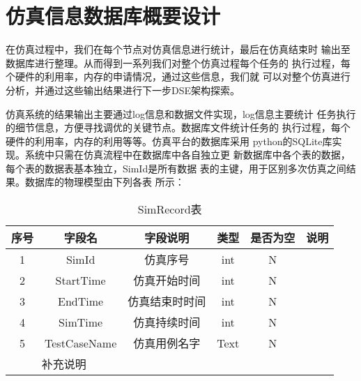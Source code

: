 \section{仿真信息数据库概要设计}
在仿真过程中，我们在每个节点对仿真信息进行统计，最后在仿真结束时
输出至数据库进行整理。从而得到一系列我们对整个仿真过程每个任务的
执行过程，每个硬件的利用率，内存的申请情况，通过这些信息，我们就
可以对整个仿真进行分析，并通过这些输出结果进行下一步DSE架构探索。

仿真系统的结果输出主要通过log信息和数据文件实现，log信息主要统计
任务执行的细节信息，方便寻找调优的关键节点。数据库文件统计任务的
执行过程，每个硬件的利用率，内存的利用等等。仿真平台的数据库采用
python的SQLite库实现。系统中只需在仿真流程中在数据库中各自独立更
新数据库中各个表的数据，每个表的数据表基本独立，SimId是所有数据
表的主键，用于区别多次仿真之间结果。数据库的物理模型由下列各表
所示：

\begin{table}[!h]
    \centering\normalsize
    \caption{SimRecord表}
    \begin{tabular}{|c|c|c|c|c|c|}
    \hline
    \textbf{序号} & \textbf{字段名} & \textbf{字段说明} & \textbf{类型} & \textbf{是否为空} & \textbf{说明} \\ \hline
    1           & SimId        & 仿真序号          & int         & N             &             \\ \hline
    2           & StartTime    & 仿真开始时间        & int         & N             &             \\ \hline
    3           & EndTime      & 仿真结束时时间       & int         & N             &             \\ \hline
    4           & SimTime      & 仿真持续时间        & int         & N             &             \\ \hline
    5           & TestCaseName & 仿真用例名字        & Text        & N             &             \\ \hline
    \multicolumn{2}{|c|}{补充说明} &               &             &               &             \\ \hline
    \end{tabular}
    \end{table}

